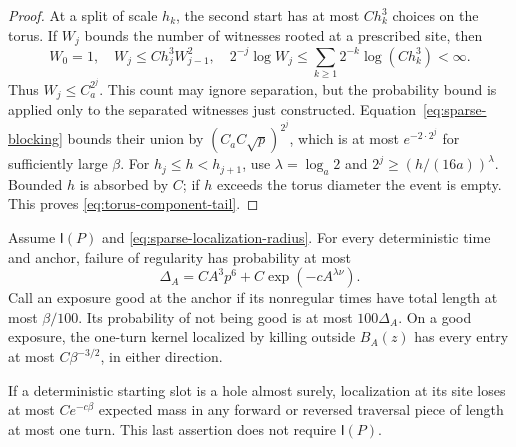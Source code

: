 \begin{proof}
At a split of scale \(h_k\), the second start has at most
\(Ch_k^3\) choices on the torus.  If \(W_j\) bounds the number
of witnesses rooted at a prescribed site, then
\[
 W_0=1,\quad W_j\le Ch_j^3W_{j-1}^2,\quad
 2^{-j}\log W_j\le\sum_{k\ge1}2^{-k}\log(Ch_k^3)<\infty.
\]
Thus \(W_j\le C_a^{2^j}\).  This count may ignore separation,
but the probability bound is applied only to the separated witnesses
just constructed.  Equation~\eqref{eq:sparse-blocking} bounds their
union by \((C_aC\sqrt p)^{2^j}\), which is at most
\(e^{-2\cdot2^j}\) for sufficiently large \(\beta\).
For \(h_j\le h<h_{j+1}\), use \(\lambda=\log_a2\) and
\(2^j\ge(h/(16a))^\lambda\).  Bounded \(h\) is absorbed by
\(C\); if \(h\) exceeds the torus diameter the event is empty.
This proves \eqref{eq:torus-component-tail}.
\end{proof}

\begin{lemma}\label{lem:torus-diffusion}
Assume \(\mathsf I(P)\) and \eqref{eq:sparse-localization-radius}.
For every deterministic time and anchor, failure of regularity has
probability at most
\begin{equation}\label{eq:torus-irregularity}
 \Delta_A=CA^3p^6+C\exp(-cA^{\lambda\nu}).
\end{equation}
Call an exposure good at the anchor if its nonregular times have total
length at most \(\beta/100\).  Its probability of not being good is
at most \(100\Delta_A\).  On a good exposure, the one-turn kernel
localized by killing outside \(B_A(z)\) has every entry at most
\(C\beta^{-3/2}\), in either direction.

If a deterministic starting slot is a hole almost surely, localization
at its site loses at most \(Ce^{-c\beta}\) expected mass in any
forward or reversed traversal piece of length at most one turn.  This
last assertion does not require \(\mathsf I(P)\).
\end{lemma}

